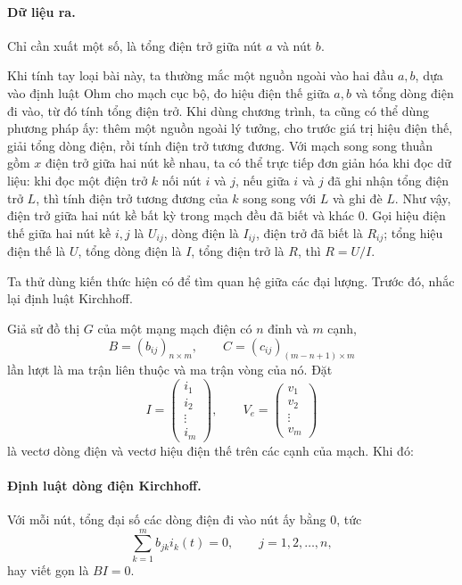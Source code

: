 \documentclass[11pt]{article}
\begin{document}
\paragraph{Dữ liệu ra.}
Chỉ cần xuất một số, là tổng điện trở giữa nút \(a\) và nút \(b\).

Khi tính tay loại bài này, ta thường mắc một nguồn ngoài vào hai đầu \(a,b\),
dựa vào định luật Ohm cho mạch cục bộ, đo hiệu điện thế giữa \(a,b\) và tổng
dòng điện đi vào, từ đó tính tổng điện trở. Khi dùng chương trình, ta cũng có
thể dùng phương pháp ấy: thêm một nguồn ngoài lý tưởng, cho trước giá trị hiệu
điện thế, giải tổng dòng điện, rồi tính điện trở tương đương. Với mạch song
song thuần gồm \(x\) điện trở giữa hai nút kề nhau, ta có thể trực tiếp đơn
giản hóa khi đọc dữ liệu: khi đọc một điện trở \(k\) nối nút \(i\) và \(j\),
nếu giữa \(i\) và \(j\) đã ghi nhận tổng điện trở \(L\), thì tính điện trở
tương đương của \(k\) song song với \(L\) và ghi đè \(L\). Như vậy, điện trở
giữa hai nút kề bất kỳ trong mạch đều đã biết và khác 0. Gọi hiệu điện thế
giữa hai nút kề \(i,j\) là \(U_{ij}\), dòng điện là \(I_{ij}\), điện trở đã
biết là \(R_{ij}\); tổng hiệu điện thế là \(U\), tổng dòng điện là \(I\), tổng
điện trở là \(R\), thì \(R=U/I\).

Ta thử dùng kiến thức hiện có để tìm quan hệ giữa các đại lượng. Trước đó,
nhắc lại định luật Kirchhoff.

Giả sử đồ thị \(G\) của một mạng mạch điện có \(n\) đỉnh và \(m\) cạnh,
\[
  B=(b_{ij})_{n\times m},\qquad
  C=(c_{ij})_{(m-n+1)\times m}
\]
lần lượt là ma trận liên thuộc và ma trận vòng của nó. Đặt
\[
  I=\begin{pmatrix}i_1\\i_2\\ \vdots\\ i_m\end{pmatrix},\qquad
  V_e=\begin{pmatrix}v_1\\v_2\\ \vdots\\ v_m\end{pmatrix}
\]
là vectơ dòng điện và vectơ hiệu điện thế trên các cạnh của mạch. Khi đó:

\paragraph{Định luật dòng điện Kirchhoff.}
Với mỗi nút, tổng đại số các dòng điện đi vào nút ấy bằng 0, tức
\[
  \sum_{k=1}^{m} b_{jk}i_k(t)=0,\qquad j=1,2,\ldots,n,
\]
hay viết gọn là \(BI=0\).
\end{document}

